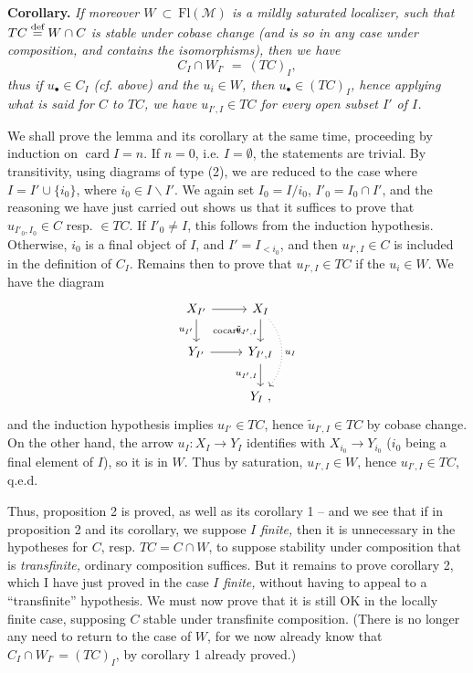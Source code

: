 \documentclass[11pt]{article}
\newcommand{\printedpage}[1]{\marginpar{\footnotesize p.~#1}}
\newcommand{\msp}[1]{\marginpar{\footnotesize [#1]}}
\newcommand{\cocart}{\text{\scriptsize cocart.}}
\begin{document}
\textbf{Corollary.} \textit{If moreover $W \ \subset\ \mathrm{Fl}(\mathcal{M})$ is a mildly saturated localizer, such that $TC \overset{\textup{def}}{=} W \cap C$ is stable under cobase change (and is so in any case under composition, and contains the isomorphisms), then we have}
\[
C_I \cap W_{I^\circ} \ = \ (TC)_I,
\]
\textit{thus if $u_\bullet \in C_I$ (cf. above) and the $u_i \in W$, then $u_\bullet \in (TC)_I$, hence applying what is said for $C$ to $TC$, we have $u_{I',I} \in TC$ for every} \msp{page 19} \textit{open subset $I'$ of $I$.}

We shall prove the lemma and its corollary at the same time, proceeding by induction on $\operatorname{card} I = n$. If $n = 0$, i.e. $I = \emptyset$, the statements are trivial. By transitivity, using diagrams of type (2), we are reduced to the case where $I = I' \cup \{i_0\}$, where $i_0 \in I \backslash I'$. We again set $I_0 = I/i_0$, $I'_0 = I_0 \cap I'$, and the reasoning we have just carried out shows us that it suffices to prove that $u_{I'_0,I_0} \in C$ resp. $\in TC$. If $I'_0 \neq I$, this follows from the induction hypothesis. %
Otherwise, $i_0$ is a final object of $I$, and $I' = I_{<i_0}$, and then $u_{I',I} \in C$ is included in the definition of $C_I$. Remains then to prove that $u_{I',I} \in TC$ if the $u_i \in W$. We have the diagram
\printedpage{12}
\[
\begin{tikzcd}
X_{I'} \arrow[r] \arrow[d, "u_{I'}"'] \arrow[dr, phantom, "\cocart"] & X_I \arrow[d, "\tilde{u}_{I',I}"'] \arrow[dd, dotted, bend left=40, "u_I"] \\
Y_{I'} \arrow[r] & Y_{I',I} \arrow[d, "u_{I',I}"'] \\
 & Y_I\ ,
\end{tikzcd}
\]
\msp{page 20} and the induction hypothesis implies $u_{I'} \in TC$, hence $\tilde{u}_{I',I} \in TC$ by cobase change. On the other hand, the arrow $u_I : X_I \longrightarrow Y_I$ identifies with $X_{i_0} \longrightarrow Y_{i_0}$ ($i_0$ being a final element of $I$), so it is in $W$. Thus by saturation, $u_{I',I} \in W$, hence $u_{I',I} \in TC$, q.e.d.

Thus, proposition 2 is proved, as well as its corollary 1 -- and we see that if in proposition 2 and its corollary, we suppose $I$ \textit{finite,} then it is unnecessary in the hypotheses for $C$, resp. $TC = C \cap W$, to suppose stability under composition that is \textit{transfinite,} ordinary composition suffices. But it remains to prove corollary 2, which I have just proved in the case $I$ \textit{finite,} without having to appeal to a ``transfinite'' hypothesis. We must now prove that it is still OK in the locally finite case, supposing $C$ stable under transfinite composition. (There is no longer any need to return to the case of $W$, for we now already know that $C_I \cap W_{I^\circ} = (TC)_I$, by corollary 1 already proved.)
\end{document}
